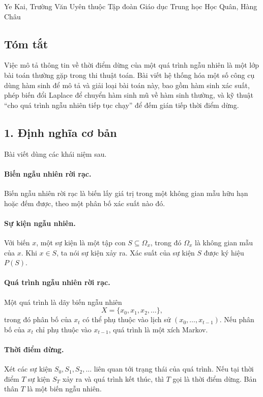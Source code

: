 \documentclass[11pt]{article}
\begin{document}
\begin{center}
Ye Kai, Trường Văn Uyên thuộc Tập đoàn Giáo dục Trung học Học Quân, Hàng Châu
\end{center}

\subsection*{Tóm tắt}

Việc mô tả thông tin về thời điểm dừng của một quá trình ngẫu nhiên là một lớp
bài toán thường gặp trong thi thuật toán. Bài viết hệ thống hóa một số công cụ
dùng hàm sinh để mô tả và giải loại bài toán này, bao gồm hàm sinh xác suất,
phép biến đổi Laplace để chuyển hàm sinh mũ về hàm sinh thường, và kỹ thuật
``cho quá trình ngẫu nhiên tiếp tục chạy'' để đếm gián tiếp thời điểm dừng.

\subsection*{1. Định nghĩa cơ bản}

Bài viết dùng các khái niệm sau.

\paragraph{Biến ngẫu nhiên rời rạc.}
Biến ngẫu nhiên rời rạc là biến lấy giá trị trong một không gian mẫu hữu hạn
hoặc đếm được, theo một phân bố xác suất nào đó.

\paragraph{Sự kiện ngẫu nhiên.}
Với biến \(x\), một sự kiện là một tập con \(S\subseteq\Omega_x\), trong đó
\(\Omega_x\) là không gian mẫu của \(x\). Khi \(x\in S\), ta nói sự kiện xảy
ra. Xác suất của sự kiện \(S\) được ký hiệu \(P(S)\).

\paragraph{Quá trình ngẫu nhiên rời rạc.}
Một quá trình là dãy biến ngẫu nhiên
\[
  X=\{x_0,x_1,x_2,\ldots\},
\]
trong đó phân bố của \(x_t\) có thể phụ thuộc vào lịch sử
\((x_0,\ldots,x_{t-1})\). Nếu phân bố của \(x_t\) chỉ phụ thuộc vào
\(x_{t-1}\), quá trình là một xích Markov.

\paragraph{Thời điểm dừng.}
Xét các sự kiện \(S_0,S_1,S_2,\ldots\) liên quan tới trạng thái của quá trình.
Nếu tại thời điểm \(T\) sự kiện \(S_T\) xảy ra và quá trình kết thúc, thì
\(T\) gọi là thời điểm dừng. Bản thân \(T\) là một biến ngẫu nhiên.
\end{document}
